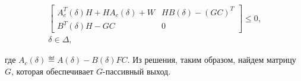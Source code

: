 \begin{alg}
\begin{enumerate}
\begin{eqnarray}
\label{eq:5/15}
\left[ \begin{array}{cc}
A_c^T(\delta)H + HA_c(\delta) + W   &   HB(\delta) - (GC)^T \\
B^T(\delta)H - GC   &   0
\end{array} \right] \leqslant 0\mbox{,} \\
\delta \in \Delta\mbox{,} \nonumber
\end{eqnarray}

где $A_c(\delta) \eqdef A(\delta) - B(\delta)FC$. Из решения, таким образом, найдем матрицу $G$, которая обеспечивает $G$-пассивный выход.

\end{enumerate}
\end{alg}
